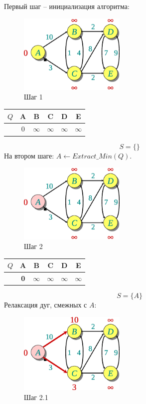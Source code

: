 \documentclass[11pt]{article}
\begin{document}
Первый шаг -- инициализация алгоритма:
\begin{figure}[h!]
  \centering
  \includegraphics[width=2in]{lecture17/dijkstra1.eps}
  \caption{Шаг 1}
\end{figure}
\begin{center}
\begin{tabular}{|r|c|c|c|c|c|}
  \hline
     $Q$ & \textbf{A} & \textbf{B} & \textbf{C} & \textbf{D} & \textbf{E} \\
  \hline
         & 0 & $\infty$ & $\infty$ & $\infty$ & $\infty$  \\
  \hline
\end{tabular}
\end{center}
\begin{equation*}
  S = \{\}
\end{equation*}
\newpage
На втором шаге: $A \leftarrow Extract\_Min(Q)$.
\begin{figure}[h!]
  \centering
  \includegraphics[width=2in]{lecture17/dijkstra2.eps}
  \caption{Шаг 2}
\end{figure}
\begin{center}
\begin{tabular}{|r|c|c|c|c|c|}
  \hline
     $Q$ & A & \textbf{B} & \textbf{C} & \textbf{D} & \textbf{E} \\
  \hline
         & \textbf{0} & $\infty$ & $\infty$ & $\infty$ & $\infty$ \\
  \hline
\end{tabular}
\end{center}
\begin{equation*}
  S = \{A\}
\end{equation*}
Релаксация дуг, смежных с $A$:
\begin{figure}[h!]
  \centering
  \includegraphics[width=2in]{lecture17/dijkstra21.eps}
  \caption{Шаг 2.1}
\end{figure}
\end{document}
